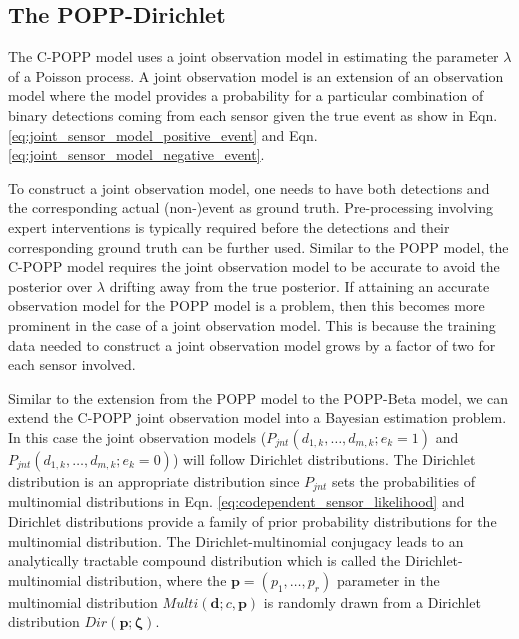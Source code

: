 
\subsection{The POPP-Dirichlet}
\label{subsec:popd}

The C-POPP model uses a joint observation model in estimating the parameter $\lambda$ of a Poisson process. A joint observation model is an extension of an observation model where the model provides a probability for a particular combination of binary detections coming from each sensor given the true event as show in Eqn. \ref{eq:joint_sensor_model_positive_event} and Eqn. \ref{eq:joint_sensor_model_negative_event}.

To construct a joint observation model, one needs to have both detections and the corresponding actual (non-)event as ground truth. Pre-processing involving expert interventions is typically required before the detections and their corresponding ground truth can be further used. Similar to the POPP model, the C-POPP model requires the joint observation model to be accurate to avoid the posterior over $\lambda$ drifting away from the true posterior. If attaining an accurate observation model for the POPP model is a problem, then this becomes more prominent in the case of a joint observation model. This is because the training data needed to construct a joint observation model grows by a factor of two for each sensor involved.       

Similar to the extension from the POPP model to the POPP-Beta model, we can extend the C-POPP joint observation model into a Bayesian estimation problem. In this case the joint observation models ($P_{jnt}(d_{1,k}, \ldots, d_{m,k} ; e_k = 1)$ and $P_{jnt}(d_{1,k}, \ldots, d_{m,k} ; e_k = 0)$) will follow Dirichlet distributions. The Dirichlet distribution is an appropriate distribution since $P_{jnt}$ sets the probabilities of multinomial distributions in Eqn. \ref{eq:codependent_sensor_likelihood} and Dirichlet distributions provide a family of prior probability distributions for the multinomial distribution. The Dirichlet-multinomial conjugacy leads to an analytically tractable compound distribution which is called the Dirichlet-multinomial distribution, where the $\mathbf{p} = (p_1, \ldots, p_r)$ parameter in the multinomial distribution $Multi(\mathbf{d} ; c, \mathbf{p})$ is randomly drawn from a Dirichlet distribution $Dir(\mathbf{p} ; \mathbf{\zeta})$. 

